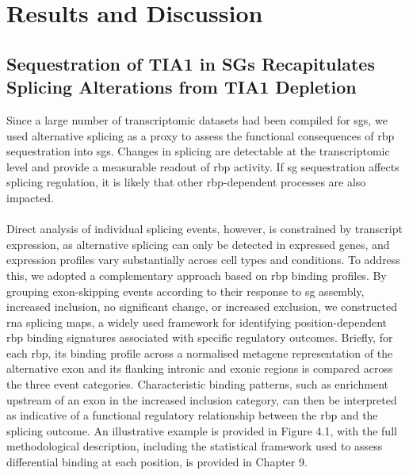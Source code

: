 \section{Results and Discussion}

\subsection{Sequestration of TIA1 in SGs Recapitulates Splicing Alterations from TIA1 Depletion}

Since a large number of transcriptomic datasets had been compiled for \glspl{sg}, we used alternative splicing as a proxy to assess the functional consequences of \gls{rbp} sequestration into \glspl{sg}. Changes in splicing are detectable at the transcriptomic level and provide a measurable readout of \gls{rbp} activity. If \gls{sg} sequestration affects splicing regulation, it is likely that other \gls{rbp}-dependent processes are also impacted.
\\
\\
Direct analysis of individual splicing events, however, is constrained by transcript expression, as alternative splicing can only be detected in expressed genes, and expression profiles vary substantially across cell types and conditions\cite{van_nostrand_large-scale_2020}. To address this, we adopted a complementary approach based on \gls{rbp} binding profiles. By grouping exon-skipping events according to their response to \gls{sg} assembly, increased inclusion, no significant change, or increased exclusion, we constructed \gls{rna} splicing maps, a widely used framework for identifying position-dependent \gls{rbp} binding signatures associated with specific regulatory outcomes\cite{van_nostrand_large-scale_2020}. Briefly, for each \gls{rbp}, its binding profile across a normalised metagene representation of the alternative exon and its flanking intronic and exonic regions is compared across the three event categories. Characteristic binding patterns, such as enrichment upstream of an exon in the increased inclusion category, can then be interpreted as indicative of a functional regulatory relationship between the \gls{rbp} and the splicing outcome. An illustrative example is provided in Figure 4.1, with the full methodological description, including the statistical framework used to assess differential binding at each position, is provided in Chapter 9.

